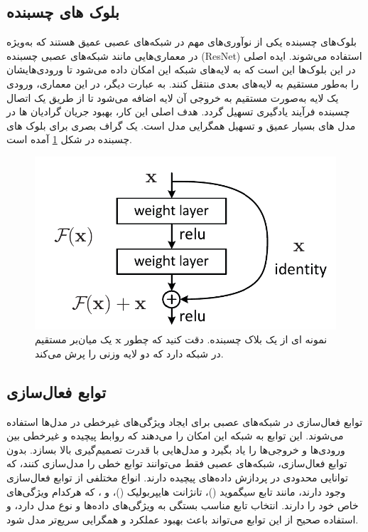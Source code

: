 \subsection{بلوک های چسبنده}
بلوک‌های چسبنده%
\cite{heDeepResidualLearning2015}
یکی از نوآوری‌های مهم در شبکه‌های عصبی عمیق هستند که به‌ویژه در معماری‌هایی مانند شبکه‌های عصبی چسبنده (ResNet) استفاده می‌شوند. ایده اصلی در این بلوک‌ها این است که به لایه‌های شبکه این امکان داده می‌شود تا ورودی‌هایشان را به‌طور مستقیم به لایه‌های بعدی منتقل کنند. به عبارت دیگر، در این معماری، ورودی یک لایه به‌صورت مستقیم به خروجی آن لایه اضافه می‌شود تا از طریق یک اتصال چسبنده فرآیند یادگیری تسهیل گردد. هدف اصلی این کار، بهبود جریان گرادیان ها در مدل های بسیار عمیق و تسهیل همگرایی مدل است. یک گراف بصری برای بلوک های چسبنده در شکل
\ref{fig:resb1}
آمده است.

\begin{figure}
	\centering
	\includegraphics[width=0.7\linewidth]{resb1}
	\caption{نمونه ای از یک بلاک چسبنده. دقت کنید که چطور $\mathbf{x}$ یک میان‌بر مستقیم در شبکه دارد که دو لایه وزنی را پرش می‌کند.}
	\label{fig:resb1}
\end{figure}


\subsection{توابع فعال‌سازی}
توابع فعال‌سازی%
در شبکه‌های عصبی برای ایجاد ویژگی‌های غیرخطی در مدل‌ها استفاده می‌شوند. این توابع به شبکه این امکان را می‌دهند که روابط پیچیده و غیرخطی بین ورودی‌ها و خروجی‌ها را یاد بگیرد و مدل‌هایی با قدرت تصمیم‌گیری بالا بسازد. بدون توابع فعال‌سازی، شبکه‌های عصبی فقط می‌توانند توابع خطی را مدل‌سازی کنند، که توانایی محدودی در پردازش داده‌های پیچیده دارند. انواع مختلفی از توابع فعال‌سازی وجود دارند، مانند تابع سیگموید ()، تانژانت هایپربولیک ()،  و ، که هرکدام ویژگی‌های خاص خود را دارند. انتخاب تابع مناسب بستگی به ویژگی‌های داده‌ها و نوع مدل دارد، و استفاده صحیح از این توابع می‌تواند باعث بهبود عملکرد و همگرایی سریع‌تر مدل شود.


